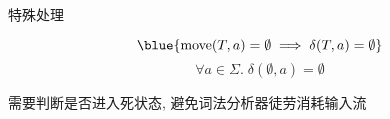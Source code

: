 \begin{frame}{}
  \begin{center}
    特殊处理 

    \[
      \blue{\text{move}(T, a) = \emptyset
        \implies \delta(T, a) = \emptyset}
    \]
    \[
      \forall a \in \Sigma.\; \delta(\emptyset, a) = \emptyset
    \]

    需要判断是否进入死状态, 避免词法分析器徒劳消耗输入流
  \end{center}
\end{frame}
